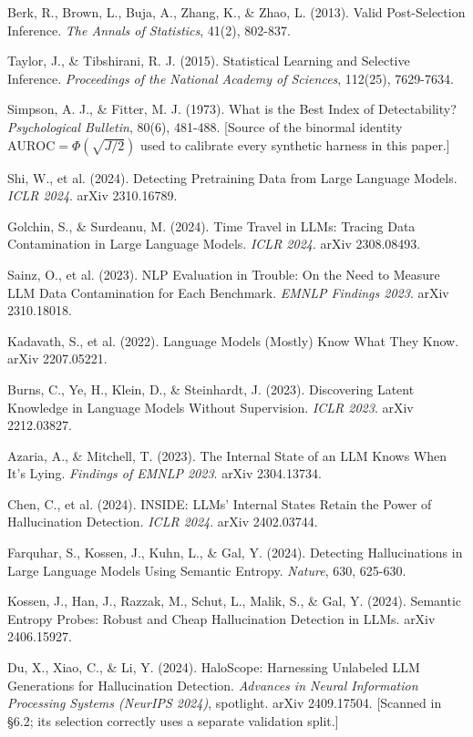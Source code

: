 \documentclass[10pt]{article} %
\begin{document}
Berk, R., Brown, L., Buja, A., Zhang, K., \& Zhao, L. (2013). Valid
Post-Selection Inference. \emph{The Annals of Statistics}, 41(2), 802-837.

Taylor, J., \& Tibshirani, R. J. (2015). Statistical Learning and Selective
Inference. \emph{Proceedings of the National Academy of Sciences}, 112(25),
7629-7634.

Simpson, A. J., \& Fitter, M. J. (1973). What is the Best Index of
Detectability? \emph{Psychological Bulletin}, 80(6), 481-488. [Source of
the binormal identity $\text{AUROC}=\Phi(\sqrt{J/2})$ used to calibrate
every synthetic harness in this paper.]

Shi, W., et al. (2024). Detecting Pretraining Data from Large Language
Models. \emph{ICLR 2024}. arXiv 2310.16789.

Golchin, S., \& Surdeanu, M. (2024). Time Travel in LLMs: Tracing Data
Contamination in Large Language Models. \emph{ICLR 2024}. arXiv 2308.08493.

Sainz, O., et al. (2023). NLP Evaluation in Trouble: On the Need to
Measure LLM Data Contamination for Each Benchmark. \emph{EMNLP Findings
2023}. arXiv 2310.18018.

Kadavath, S., et al. (2022). Language Models (Mostly) Know What They Know.
arXiv 2207.05221.

Burns, C., Ye, H., Klein, D., \& Steinhardt, J. (2023). Discovering Latent
Knowledge in Language Models Without Supervision. \emph{ICLR 2023}.
arXiv 2212.03827.

Azaria, A., \& Mitchell, T. (2023). The Internal State of an LLM Knows When
It's Lying. \emph{Findings of EMNLP 2023}. arXiv 2304.13734.

Chen, C., et al. (2024). INSIDE: LLMs' Internal States Retain the Power of
Hallucination Detection. \emph{ICLR 2024}. arXiv 2402.03744.

Farquhar, S., Kossen, J., Kuhn, L., \& Gal, Y. (2024). Detecting
Hallucinations in Large Language Models Using Semantic Entropy.
\emph{Nature}, 630, 625-630.

Kossen, J., Han, J., Razzak, M., Schut, L., Malik, S., \& Gal, Y. (2024).
Semantic Entropy Probes: Robust and Cheap Hallucination Detection in LLMs.
arXiv 2406.15927.

Du, X., Xiao, C., \& Li, Y. (2024). HaloScope: Harnessing Unlabeled LLM
Generations for Hallucination Detection. \emph{Advances in Neural Information
Processing Systems (NeurIPS 2024)}, spotlight. arXiv 2409.17504. [Scanned in §6.2;
its selection correctly uses a separate validation split.]
\end{document}
